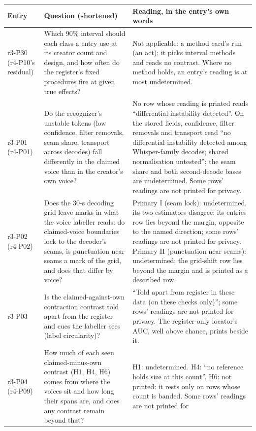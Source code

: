 \begin{table}[tp]
\centering
\footnotesize
\begin{tabular}{@{}p{}p{}p{}@{}}
\toprule
Entry & Question (shortened) & Reading, in the entry's own words \\
\midrule
r3-P30 (r4-P10's residual) & Which 90\% interval should each class-a entry use at its creator count and design, and
how often do the register's fixed procedures fire at given true effects? & Not applicable: a method card's run (an act);
it picks interval methods and reads no contrast. Where no method holds, an entry's reading is at most undetermined. \\
r3-P01 (r4-P01) & Do the recognizer's unstable tokens (low confidence, filter removals, seam share, transport across
decodes) fall differently in the claimed voice than in the creator's own voice? & No row whose reading is printed reads
``differential instability detected''. On the stored fields, confidence, filter removals and transport read ``no
differential instability detected among Whisper-family decodes; shared normalisation untested''; the seam share and
both second-decode bases are undetermined. Some rows' readings are not printed for privacy. \\
r3-P02 (r4-P02) & Does the 30-s decoding grid leave marks in what the voice labeller reads: do claimed-voice boundaries
lock to the decoder's seams, is punctuation near seams a mark of the grid, and does that differ by voice? & Primary I
(seam lock): undetermined, its two estimators disagree; its entries row lies beyond the margin, opposite to the named
direction; some rows' readings are not printed for privacy. Primary II (punctuation near seams): undetermined; the
grid-shift row lies beyond the margin and is printed as a described row. \\
r3-P03 & Is the claimed-against-own contraction contrast told apart from the register and cues the labeller sees
(label circularity)? & ``Told apart from register in these data (on these checks only)''; some rows' readings are not
printed for privacy. The register-only locator's AUC, well above chance, prints beside it. \\
r3-P04 (r4-P09) & How much of each seen claimed-minus-own contrast (H1, H4, H6) comes from where the voices sit and how
long their spans are, and does any contrast remain beyond that? & H1: undetermined. H4: ``no reference holds size at
this count''. H6: not printed: it rests only on rows whose count is banded. Some rows' readings are not printed for

\end{tabular}
\end{table}
